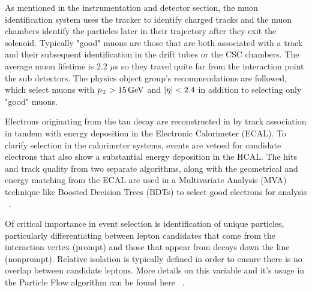 
As mentioned in the instrumentation and detector section, the muon identification system uses the tracker to identify charged tracks and the muon chambers identify the particles later in their trajectory after they exit the solenoid. Typically "good" muons are those that are both associated with a track and their subsequent identification in the drift tubes or the CSC chambers. The average muon lifetime is 2.2 $\mu$s so they travel quite far from the interaction point the sub detectors.  The physics object group's recommendations are followed, which select muons with $p_{\mathrm{T}}>15\,\text{Ge\hspace{-.08em}V}$ and $\lvert \eta \rvert<2.4$ in addition to selecting only "good" muons.



Electrons originating from the tau decay are reconstructed in by track association in tandem with energy deposition in the Electronic Calorimeter (ECAL). To clarify selection in the calorimeter systems, events are vetoed for candidate electrons that also show a substantial energy deposition in the HCAL. The hits and track quality from two separate algorithms, along with the geometrical and energy matching from the ECAL are used in a Multivariate Analysis (MVA) technique like Boosted Decision Trees (BDTs) to select good electrons for analysis 
~\cite{Khachatryan:2015hwa}.


Of critical importance in event selection is identification of unique particles, particularly differentiating between lepton candidates that come from the interaction vertex (prompt) and those that appear from decays down the line (nonprompt). Relative isolation is typically defined in order to ensure there is no overlap between candidate leptons. More details on this variable and it's usage in the Particle Flow algorithm can be found here  ~\cite{Sirunyan_2017}. 

